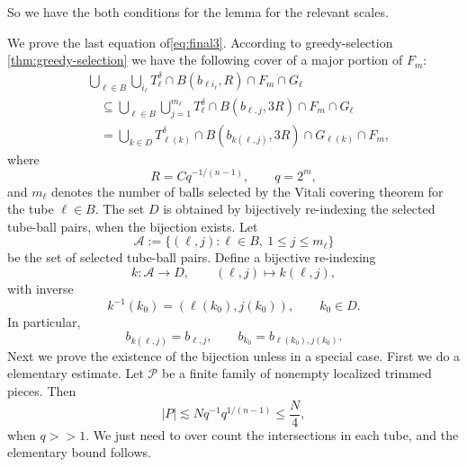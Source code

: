 \documentclass[11pt, letterpaper]{nyjm}
\begin{document}
So we have the both conditions for the lemma for the relevant scales.



We prove the last equation of\eqref{eq:final3}.
According to greedy-selection \ref{thm:greedy-selection} we have the following cover of a major portion of $F_m$: 
\[
\begin{aligned}
	&\bigcup_{\ell\in B}\bigcup_{i_\ell}
	T_\ell^\delta
	\cap B(b_{\ell i_\ell},R)
	\cap F_m
	\cap G_\ell\\
	&\quad\subseteq
	\bigcup_{\ell\in B}\bigcup_{j=1}^{m_\ell}
	T_\ell^\delta
	\cap B(b_{\ell, j},3R)
	\cap F_m
	\cap G_\ell\\
	&\quad=
	\bigcup_{k\in D}
	T_{\ell(k)}^\delta
	\cap B(b_{k(\ell,j)},3R)
	\cap G_{\ell(k)}
	\cap F_m,
\end{aligned}
\]
where
\[
R=Cq^{-1/(n-1)},\qquad q=2^m,
\]
and $m_\ell$ denotes the number of balls selected by
the Vitali covering theorem for the tube $\ell\in B$.
The set $D$ is obtained by bijectively re-indexing the
selected tube-ball pairs, when the bijection exists.
Let
\[
\mathcal A
:=
\{(\ell,j):\ell\in B,\ 1\le j\le m_\ell\}
\]
be the set of selected tube-ball pairs.
Define a bijective re-indexing
\[
k:\mathcal A\longrightarrow D,
\qquad
(\ell,j)\longmapsto k(\ell,j),
\]
with inverse
\[
k^{-1}(k_0)
=
(\ell(k_0),j(k_0)),
\qquad k_0\in D.
\]
In particular,
\[
b_{k(\ell,j)}=b_{\ell,j},
\qquad
b_{k_0}=b_{\ell(k_0),j(k_0)}.
\]
Next we prove the existence of the bijection unless in a special case. First we do a elementary estimate. Let $\mathcal P$ be a finite family of nonempty
localized trimmed pieces. Then 
\begin{equation} \label{eq:elementary-bound}
	|P| \lesssim Nq^{-1}q^{1/(n-1)} \leq \frac{N}{4},
\end{equation}
when $q >> 1.$ We just need to over count the intersections in each tube, and the elementary bound follows.  
\end{document}
